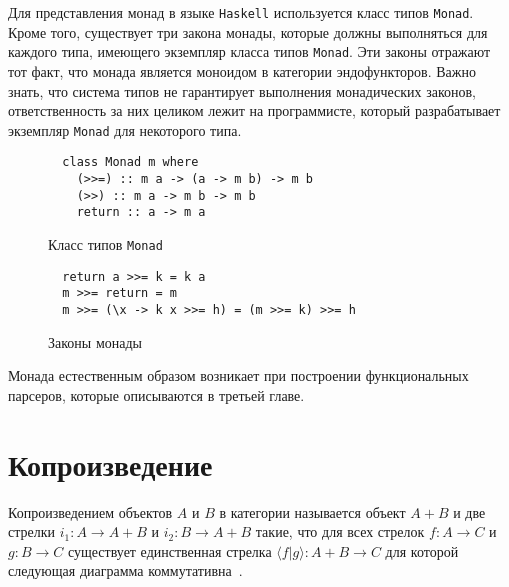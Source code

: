  Для представления монад в языке \lstinline{Haskell} используется класс типов
  \lstinline{Monad}. Кроме того, существует три закона монады, которые должны
  выполняться для каждого типа, имеющего экземпляр класса типов \lstinline{Monad}.
  Эти законы отражают тот факт, что монада является моноидом в категории
  эндофункторов. Важно знать, что система типов не гарантирует выполнения
  монадических законов, ответственность за них целиком лежит на программисте,
  который разрабатывает экземпляр \lstinline{Monad} для некоторого типа.

  \begin{figure}[h]
  \begin{lstlisting}
  class Monad m where
    (>>=) :: m a -> (a -> m b) -> m b
    (>>) :: m a -> m b -> m b
    return :: a -> m a
  \end{lstlisting}
  \caption{Класс типов \lstinline{Monad}}
  \label{listing:Monad}
  \end{figure}

  \begin{figure}[h]
  \begin{lstlisting}
  return a >>= k = k a
  m >>= return = m
  m >>= (\x -> k x >>= h) = (m >>= k) >>= h
  \end{lstlisting}
  \caption{Законы монады}
  \label{listing:MonadLaws}
  \end{figure}

  Монада естественным образом возникает при построении функциональных парсеров,
  которые описываются в третьей главе.

\section{Копроизведение}

  Копроизведением объектов $A$ и $B$ в категории называется объект $A + B$ и две
  стрелки $i_1 : A \to A + B$ и $i_2 : B \to A + B$ такие, что для всех стрелок
  $f : A \to C$ и $g : B \to C$ существует единственная стрелка
  $\langle f|g\rangle  : A + B \to C$ для которой следующая диаграмма
  коммутативна~\cite{TeorCat}.

  \begin{center}
  \end{center}

